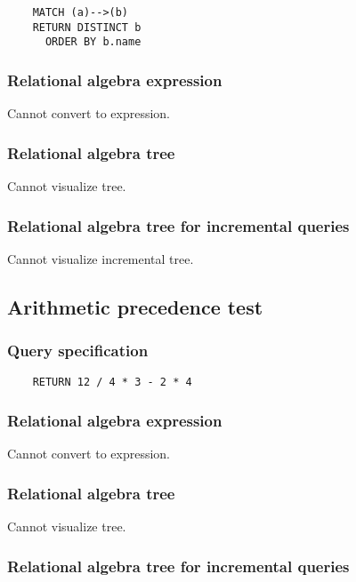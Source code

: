 	\begin{lstlisting}
	MATCH (a)-->(b)
	RETURN DISTINCT b
	  ORDER BY b.name
	\end{lstlisting}


	\subsubsection*{Relational algebra expression}

	Cannot convert to expression.

	\subsubsection*{Relational algebra tree}

	Cannot visualize tree.

	\subsubsection*{Relational algebra tree for incremental queries}

	Cannot visualize incremental tree.
	\subsection{Arithmetic precedence test}

	\subsubsection*{Query specification}

	\begin{lstlisting}
	RETURN 12 / 4 * 3 - 2 * 4
	\end{lstlisting}


	\subsubsection*{Relational algebra expression}

	Cannot convert to expression.

	\subsubsection*{Relational algebra tree}

	Cannot visualize tree.

	\subsubsection*{Relational algebra tree for incremental queries}

